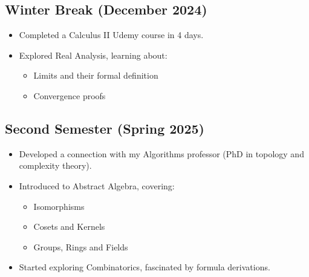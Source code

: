 \documentclass{article}
\begin{document}
\subsection{Winter Break (December 2024)}
\begin{itemize}
    \item Completed a Calculus II Udemy course in 4 days.
    \item Explored Real Analysis, learning about:
    \begin{itemize}
        \item Limits and their formal definition
        \item Convergence proofs
    \end{itemize}
\end{itemize}

\break
\subsection{Second Semester (Spring 2025)}
\begin{itemize}
    \item Developed a connection with my Algorithms professor (PhD in topology and complexity theory).
    \item Introduced to Abstract Algebra, covering:
    \begin{itemize}
        \item Isomorphisms
        \item Cosets and Kernels
        \item Groups, Rings and Fields
    \end{itemize}
    \item Started exploring Combinatorics, fascinated by formula derivations.
\end{itemize}
\end{document}
